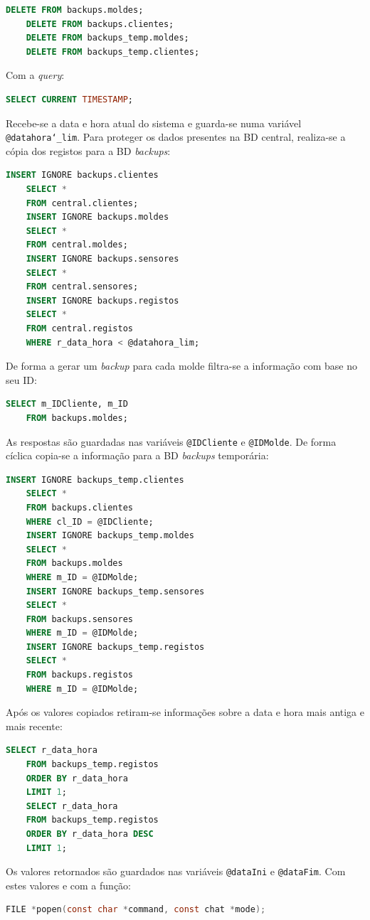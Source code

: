 \documentclass[11pt,twoside,a4paper]{report}
\begin{document}
\begin{lstlisting}[language = SQL]
	DELETE FROM backups.moldes;
	DELETE FROM backups.clientes;
	DELETE FROM backups_temp.moldes;
	DELETE FROM backups_temp.clientes;
\end{lstlisting}
Com a \textit{query}:
\begin{lstlisting}[language = SQL]
	SELECT CURRENT TIMESTAMP;
\end{lstlisting}
Recebe-se a data e hora atual do sistema e guarda-se numa variável \texttt{@datahora\char`_lim}. Para proteger os dados presentes na BD central, realiza-se a cópia dos registos para a BD \textit{backups}:
\begin{lstlisting}[language = SQL]
	INSERT IGNORE backups.clientes
	SELECT *
	FROM central.clientes;
	INSERT IGNORE backups.moldes
	SELECT *
	FROM central.moldes;
	INSERT IGNORE backups.sensores
	SELECT *
	FROM central.sensores;
	INSERT IGNORE backups.registos
	SELECT *
	FROM central.registos
	WHERE r_data_hora < @datahora_lim;
\end{lstlisting}
De forma a gerar um \textit{backup} para cada molde filtra-se a informação com base no seu ID:
\begin{lstlisting}[language = SQL]
	SELECT m_IDCliente, m_ID
	FROM backups.moldes;
\end{lstlisting}
As respostas são guardadas nas variáveis \texttt{@IDCliente} e \texttt{@IDMolde}. De forma cíclica copia-se a informação para a BD \textit{backups} temporária:
\begin{lstlisting}[language = SQL]
	INSERT IGNORE backups_temp.clientes
	SELECT *
	FROM backups.clientes
	WHERE cl_ID = @IDCliente;
	INSERT IGNORE backups_temp.moldes
	SELECT *
	FROM backups.moldes
	WHERE m_ID = @IDMolde;
	INSERT IGNORE backups_temp.sensores
	SELECT *
	FROM backups.sensores
	WHERE m_ID = @IDMolde;
	INSERT IGNORE backups_temp.registos
	SELECT *
	FROM backups.registos
	WHERE m_ID = @IDMolde;
\end{lstlisting}
Após os valores copiados retiram-se informações sobre a data e hora mais antiga e mais recente:
\begin{lstlisting}[language = SQL]
	SELECT r_data_hora
	FROM backups_temp.registos
	ORDER BY r_data_hora
	LIMIT 1;
	SELECT r_data_hora
	FROM backups_temp.registos
	ORDER BY r_data_hora DESC
	LIMIT 1;
\end{lstlisting}
Os valores retornados são guardados nas variáveis \texttt{@dataIni} e \texttt{@dataFim}. Com estes valores e com a função:
\begin{lstlisting}[language = C]
	FILE *popen(const char *command, const chat *mode);
\end{lstlisting}
\end{document}
